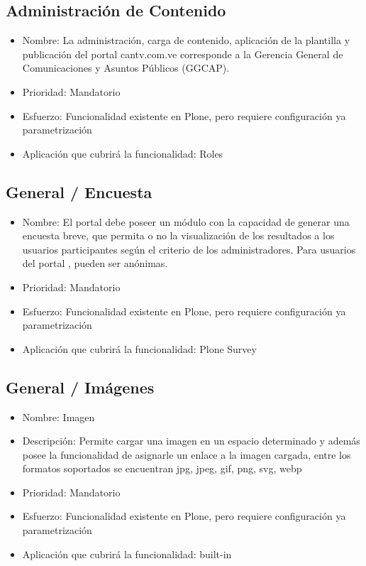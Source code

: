 \documentclass[11pt, letterpaper, oneside, spanish]{scrbook}
\begin{document}
\subsection{Administración de Contenido}
\label{sec-2-1-9}

\begin{itemize}
\item Nombre: La administración, carga de contenido, aplicación de la plantilla y
  publicación del portal cantv.com.ve corresponde a la Gerencia General de
  Comunicaciones y Asuntos Públicos (GGCAP).
\item Prioridad: Mandatorio
\item Esfuerzo: Funcionalidad existente en Plone, pero requiere configuración ya
  parametrización
\item Aplicación que cubrirá la funcionalidad: Roles
\end{itemize}
\subsection{General / Encuesta}
\label{sec-2-1-10}

\begin{itemize}
\item Nombre: El portal debe poseer un módulo con la capacidad de generar una
  encuesta breve, que permita o no la visualización de los resultados a los
  usuarios participantes según el criterio de los administradores. Para
  usuarios del portal , pueden ser anónimas.
\item Prioridad: Mandatorio
\item Esfuerzo: Funcionalidad existente en Plone, pero requiere configuración ya
  parametrización
\item Aplicación que cubrirá la funcionalidad: Plone Survey
\end{itemize}
\subsection{General / Imágenes}
\label{sec-2-1-11}

\begin{itemize}
\item Nombre: Imagen
\item Descripción: Permite cargar una imagen en un espacio determinado y además
  posee la funcionalidad de asignarle un enlace a la imagen cargada, entre los
  formatos soportados se encuentran jpg, jpeg, gif, png, svg, webp
\item Prioridad: Mandatorio
\item Esfuerzo: Funcionalidad existente en Plone, pero requiere configuración ya
  parametrización
\item Aplicación que cubrirá la funcionalidad:  built-in
\end{itemize}
\end{document}
